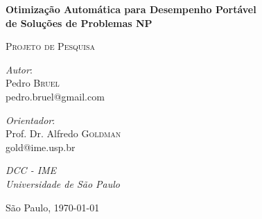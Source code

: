 \documentclass[a4paper, 11pt]{article}
\begin{document}
\hypersetup{backref,pdfpagemode=FullScreen,colorlinks=true}

\thispagestyle{empty}
\begin{center}
    \vspace*{5cm}
    \textbf{\Large{Otimização Automática para Desempenho Portável \\
            de Soluções de Problemas NP}}\\

    \vskip 1cm

    \textsc{Projeto de Pesquisa}

    \vskip 2cm

    \begin{minipage}{.4\linewidth}
        \begin{flushleft}
            \emph{Autor}: \\Pedro \textsc{Bruel}\\
            pedro.bruel@gmail.com
        \end{flushleft}
    \end{minipage}
    \begin{minipage}{.4\linewidth}
        \begin{flushright}
            \emph{Orientador}: \\Prof. Dr. Alfredo \textsc{Goldman}\\
            gold@ime.usp.br
        \end{flushright}
    \end{minipage}

    \vskip 1cm

    \normalsize{\emph{DCC - IME\\
    Universidade de São Paulo}\\}


    \vfill
    \normalsize{São Paulo, \today}
\end{center}

\newpage
\tableofcontents
\newpage
\end{document}
